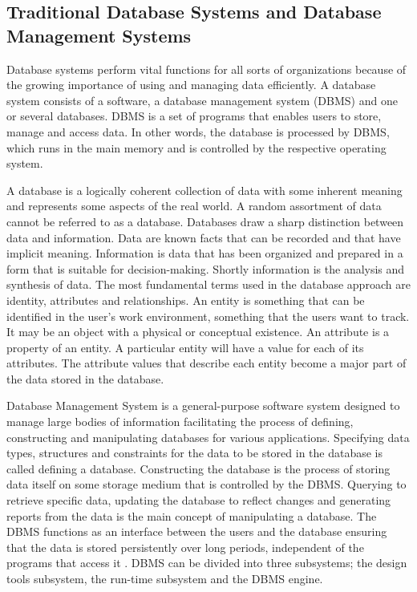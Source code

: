 \subsection{Traditional Database Systems and Database Management Systems}
Database systems perform vital functions for all sorts of organizations because
of the growing importance of using and managing data efficiently. A database
system consists of a software, a database management system (DBMS) and one or
several databases. DBMS is a set of programs that enables users to store, manage
and access data. In other words, the database is processed by DBMS, which runs
in the main memory and is controlled by the respective operating system.

A database is a logically coherent collection of data with some inherent meaning
and represents some aspects of the real world. A random assortment of data
cannot be referred to as a database. Databases draw a sharp distinction between
data and information. Data are known facts that can be recorded and that have
implicit meaning. Information is data that has been organized and prepared in a
form that is suitable for decision-making. Shortly information is the analysis
and synthesis of data. The most fundamental terms used in the database approach
are identity, attributes and relationships. An entity is something that can be
identified in the user's work environment, something that the users want to
track. It may be an object with a physical or conceptual existence. An attribute
is a property of an entity. A particular entity will have a value for each of
its attributes. The attribute values that describe each entity become a major
part of the data stored in the database.

Database Management System is a general-purpose software system designed to
manage large bodies of information facilitating the process of defining,
constructing and manipulating databases for various applications. Specifying
data types, structures and constraints for the data to be stored in the database
is called defining a database. Constructing the database is the process of
storing data itself on some storage medium that is controlled by the DBMS.
Querying to retrieve specific data, updating the database to reflect changes and
generating reports from the data is the main concept of manipulating a database.
The DBMS functions as an interface between the users and the database ensuring
that the data is stored persistently over long periods, independent of the
programs that access it \cite{latisen1998}. DBMS can be divided into three
subsystems; the design tools subsystem, the run-time subsystem and the DBMS
engine.

